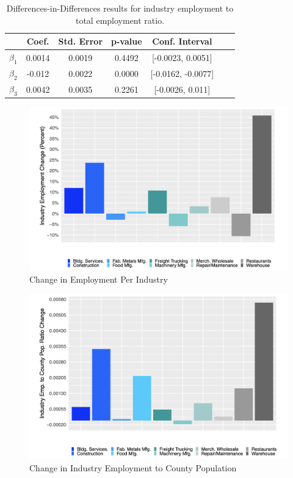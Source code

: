 \documentclass[11pt]{article}
\begin{document}
\begin{table}[H]
\centering
\begin{tabular}[H]{lcccccc}
\toprule
&Coef.&Std. Error&p-value&Conf. Interval\\
\midrule
$\beta_1$&0.0014&0.0019&0.4492&[-0.0023, 0.0051]\\
$\beta_2$&-0.012&0.0022&0.0000&[-0.0162, -0.0077]\\
$\beta_3$&0.0042&0.0035&0.2261&[-0.0026, 0.011]\\
\bottomrule
\end{tabular}
\caption{Differences-in-Differences results for industry employment to total employment ratio.}
\end{table}%


\begin{figure}[H]
\centering
\includegraphics[width=15cm]{EMP.png}
\caption{Change in Employment Per Industry}
\end{figure}


\begin{figure}[H]
\centering
\includegraphics[width=15cm]{CTEMP.png}
\caption{Change in Industry Employment to County Population}
\end{figure}
\end{document}
